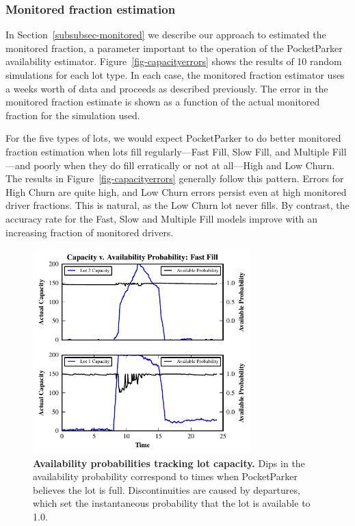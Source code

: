 \subsubsection{Monitored fraction estimation}

In Section~\ref{subsubsec-monitored} we describe our approach to estimated
the monitored fraction, a parameter important to the operation of the
PocketParker availability estimator. Figure~\ref{fig-capacityerrors} shows
the results of 10 random simulations for each lot type. In each case, the
monitored fraction estimator uses a weeks worth of data and proceeds as
described previously. The error in the monitored fraction estimate is shown
as a function of the actual monitored fraction for the simulation used.

For the five types of lots, we would expect PocketParker to do better
monitored fraction estimation when lots fill regularly---Fast Fill, Slow
Fill, and Multiple Fill---and poorly when they do fill erratically or not at
all---High and Low Churn. The results in Figure~\ref{fig-capacityerrors}
generally follow this pattern. Errors for High Churn are quite high, and Low
Churn errors persist even at high monitored driver fractions. This is
natural, as the Low Churn lot never fills.  By contrast, the accuracy rate for
the Fast, Slow and Multiple Fill models improve with an increasing fraction of
monitored drivers.

\begin{figure}[t]
\centering
\includegraphics[width=3.325in]{./simulator/figures/tracking_fastfill.pdf}

\caption{\textbf{Availability probabilities tracking lot capacity.} Dips in
the availability probability correspond to times when PocketParker believes
the lot is full. Discontinuities are caused by departures, which set the
instantaneous probability that the lot is available to 1.0.}

\label{fig-trackingexample}
\end{figure}

